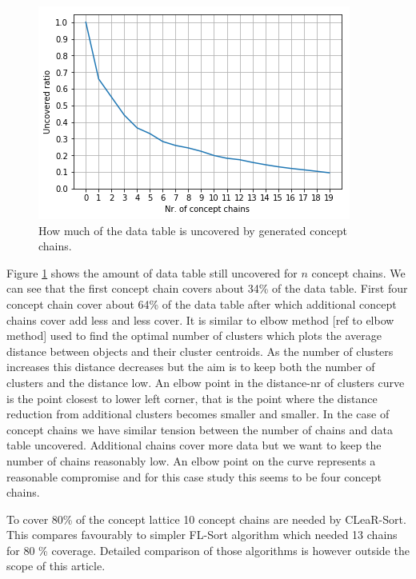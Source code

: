 \documentclass[acmconf,authordraft]{acmart}
\begin{document}
\begin{figure}[ht]
  \centering
   \includegraphics[width=\linewidth]{telia_ccc}
  \caption{How much of the data table is uncovered by generated concept chains.}
  \label{fig_cc_cover}
\end{figure}

Figure \ref{fig_cc_cover} shows the amount of data table still uncovered for $n$ concept chains.
We can see that the first concept chain covers about 34\% of the data table. First four concept chain cover about 64\% of the data table after which additional concept chains cover add less and less cover. It is similar to elbow method [ref to elbow method] used to find the optimal number of clusters which plots the average distance between objects and their cluster centroids. As the number of clusters increases this distance decreases but the aim is to keep both the number of clusters and the distance low. An elbow point in the distance-nr of clusters curve is the point closest to lower left corner, that is the point where the distance reduction from additional clusters becomes smaller and smaller. In the case of concept chains we have similar tension between the number of chains and data table uncovered. Additional chains cover more data but we want to keep the number of chains reasonably low. An elbow point on the curve represents a reasonable compromise and for this case study this seems to be four concept chains.

To cover 80\% of the concept lattice 10 concept chains are needed by CLeaR-Sort. This compares favourably to simpler FL-Sort algorithm \cite{torim_covering_2019} which needed 13 chains for 80 \% coverage. Detailed comparison of those algorithms is however outside the scope of this article.
\end{document}
